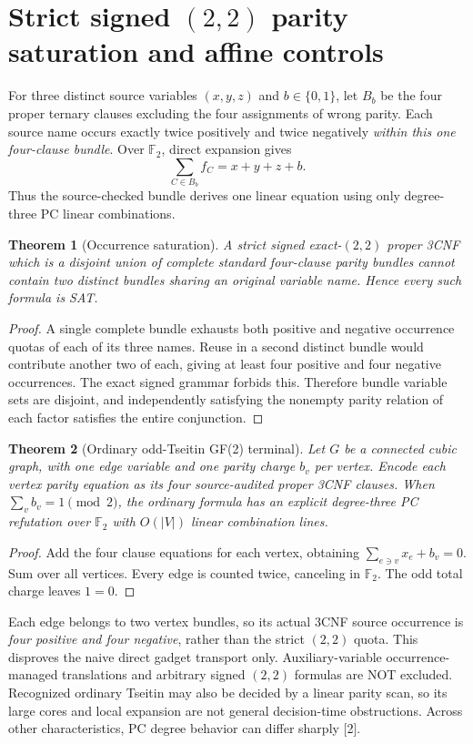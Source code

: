 \documentclass[11pt]{article}
\newtheorem{theorem}{Theorem}
\begin{document}
\section{Strict signed $(2,2)$ parity saturation and affine controls}
For three distinct source variables $(x,y,z)$ and $b\in\{0,1\}$,
let $B_b$ be the four proper ternary clauses excluding the
four assignments of wrong parity. Each source name occurs exactly
twice positively and twice negatively \emph{within this one
four-clause bundle}. Over $\mathbb F_2$, direct expansion gives
\[
\boxed{\sum_{C\in B_b} f_C=x+y+z+b.}
\]
Thus the source-checked bundle derives one linear equation
using only degree-three PC linear combinations.
\begin{theorem}[Occurrence saturation]
A strict signed exact-$(2,2)$ proper 3CNF which is a disjoint
union of complete standard four-clause parity bundles
cannot contain two distinct bundles sharing an original
variable name. Hence every such formula is SAT.
\end{theorem}
\begin{proof}
A single complete bundle exhausts both positive and negative
occurrence quotas of each of its three names. Reuse in a
second distinct bundle would contribute another two of each,
giving at least four positive and four negative occurrences.
The exact signed grammar forbids this. Therefore bundle
variable sets are disjoint, and independently satisfying
the nonempty parity relation of each factor satisfies
the entire conjunction.
\end{proof}

\begin{theorem}[Ordinary odd-Tseitin GF(2) terminal]
Let $G$ be a connected cubic graph, with one edge variable
and one parity charge $b_v$ per vertex. Encode each vertex
parity equation as its four source-audited proper 3CNF
clauses. When $\sum_vb_v=1\pmod2$, the ordinary formula
has an explicit degree-three PC refutation over
$\mathbb F_2$ with $O(|V|)$ linear combination lines.
\end{theorem}
\begin{proof}
Add the four clause equations for each vertex, obtaining
$\sum_{e\ni v}x_e+b_v=0$. Sum over all vertices.
Every edge is counted twice, canceling in $\mathbb F_2$.
The odd total charge leaves $1=0$.
\end{proof}
Each edge belongs to two vertex bundles, so its actual
3CNF source occurrence is \emph{four positive and four
negative}, rather than the strict $(2,2)$ quota.
This disproves the naive direct gadget transport only.
Auxiliary-variable occurrence-managed translations and
arbitrary signed $(2,2)$ formulas are NOT excluded.
Recognized ordinary Tseitin may also be decided by a
linear parity scan, so its large cores and local expansion
are not general decision-time obstructions. Across other
characteristics, PC degree behavior can differ sharply [2].
\end{document}
